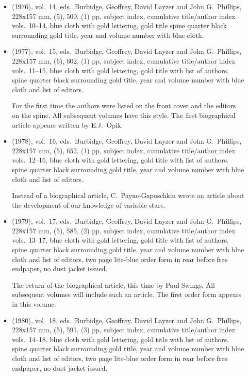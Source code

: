 \begin{itemize}
	\item (1976), vol.\ 14, eds.\ Burbidge, Geoffrey, David Layzer and John G.\ Phillips, 228x157 mm,
	(5), 500, (1) pp, subject index, cumulative title/author index vols.\ 10--14,
	blue cloth with gold lettering, gold title
  spine quarter black surrounding gold title, year and volume number with blue cloth.
	
	\item (1977), vol.\ 15, eds.\ Burbidge, Geoffrey, David Layzer and John G.\ Phillips, 228x157 mm,
	(6), 602, (1) pp, subject index, cumulative title/author index vols.\ 11--15,
	blue cloth with gold lettering, gold title with list of authors,
  spine quarter black surrounding gold title, year and volume number with blue cloth and list of
  editors.
  
  For the first time the authors were listed on the front cover and the editors on the spine.
  All subsequent volumes have this style.  The first biographical article appears written by
  E.J.\ Opik.
	
	\item (1978), vol.\ 16, eds.\ Burbidge, Geoffrey, David Layzer and John G.\ Phillips, 228x157 mm,
	(5), 652, (1) pp, subject index, cumulative title/author index vols.\ 12--16,
	blue cloth with gold lettering, gold title with list of authors,
  spine quarter black surrounding gold title, year and volume number with blue cloth and list of
  editors.
  
  Instead of a biographical article, C.\ Payne-Gaposchkin wrote an article about the development
  of our knowledge of variable stars.
   
	\item (1979), vol.\ 17, eds.\ Burbidge, Geoffrey, David Layzer and John G.\ Phillips, 228x157 mm,
	(5), 585, (2) pp, subject index, cumulative title/author index vols.\ 13--17,
	blue cloth with gold lettering, gold title with list of authors,
  spine quarter black surrounding gold title, year and volume number with blue cloth and list of
  editors, two page lite-blue order form in rear before free endpaper, no dust jacket issued.
  
  The return of the biographical article, this time by Paul Swings.  All subsequent volumes will
  include such an article. The first order form appears in this volume.
  
	\item (1980), vol.\ 18, eds.\ Burbidge, Geoffrey, David Layzer and John G.\ Phillips, 228x157 mm,
	(5), 591, (3) pp, subject index, cumulative title/author index vols.\ 14--18,
	blue cloth with gold lettering, gold title with list of authors,
  spine quarter black surrounding gold title, year and volume number with blue cloth and list of
  editors, two page lite-blue order form in rear before free endpaper, no dust jacket issued.
  

\end{itemize}
